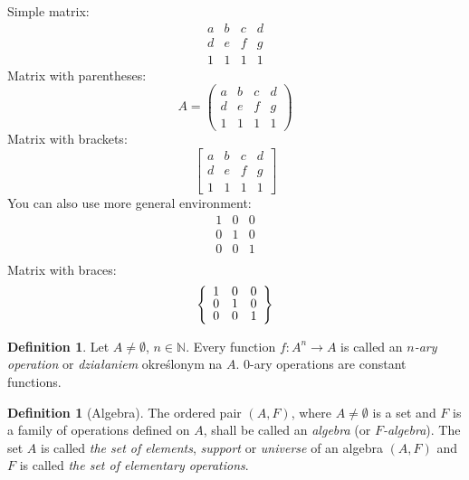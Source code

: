 \documentclass[a4paper,11pt,twoside]{report}
\theoremstyle{definition}
\newtheorem{definition}[theorem]{Definition}
\begin{document}
Simple matrix:
\begin{equation*}
	\begin{matrix}
	a & b & c & d \\
	d & e & f & g \\
	1 & 1 & 1 & 1
	\end{matrix}
\end{equation*}
%
Matrix with parentheses:
%
\begin{equation*}
	A = 
	\begin{pmatrix}
	a & b & c & d \\
	d & e & f & g \\
	1 & 1 & 1 & 1
	\end{pmatrix}
\end{equation*}
%
Matrix with brackets:
%
\begin{equation*}
	\begin{bmatrix}
	a & b & c & d \\
	d & e & f & g \\
	1 & 1 & 1 & 1
	\end{bmatrix}
\end{equation*}
%
You can also use more general environment:
%
\begin{equation*}
	\renewcommand{\arraystretch}{0.8}
	\begin{array}{ccc}
	1 & 0 & 0 \\
	0 & 1 & 0 \\
	0 & 0 & 1 \\
	\end{array}
\end{equation*}
%
Matrix with braces:
%
\begin{equation*}
	\left\{
	\renewcommand{\arraystretch}{0.8}
	\begin{array}{ccc}
	1 & 0 & 0 \\
	0 & 1 & 0 \\
	0 & 0 & 1 \\
	\end{array}\right\}
\end{equation*}

\begin{definition}
	Let $A\neq \emptyset$, $n \in \mathbb{N}$. Every function $f\colon A^n \to A$ is called an \emph{$n$-ary operation} or \emph{działaniem} określonym na $A$.
	$0$-ary operations are constant functions.
\end{definition}


\begin{definition}[Algebra]
	The ordered pair $(A,F)$, where $A\neq \emptyset$ is a set and $F$ is a family of operations defined on $A$, shall be called an \emph{algebra} (or \emph{$F$-algebra}). The set $A$ is called \emph{the set of elements}, \emph{support} or \emph{universe} of an algebra $(A,F)$ and $F$ is called \emph{the set of elementary operations}.
\end{definition}
\end{document}
